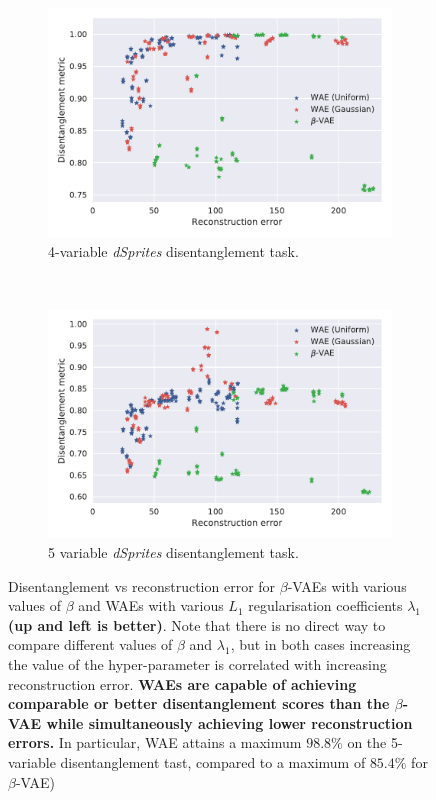 \documentclass{article}
\begin{document}
\begin{figure}[t!]
	\centering
	\begin{subfigure}[t]{0.5\textwidth}
		\centering
		\includegraphics[width=\columnwidth]{main_paper_reconstruction_error_vs_disentanglement_4}
		\caption{\label{subfig:disentanglement-vs-reconstruction-4}4-variable \emph{dSprites} disentanglement task.}
	\end{subfigure}%
	~ 
	\begin{subfigure}[t]{0.5\textwidth}
		\centering
		\includegraphics[width=\columnwidth]{main_paper_reconstruction_error_vs_disentanglement_5}
		\caption{\label{subfig:disentanglement-vs-reconstruction-5}5 variable \emph{dSprites} disentanglement task.}
	\end{subfigure}
	\caption{\label{fig:disentanglement-vs-reconstruction}Disentanglement vs reconstruction error for $\beta$-VAEs with various values of $\beta$ and WAEs with various $L_1$ regularisation coefficients $\lambda_1$ \textbf{(up and left is better)}. Note that there is no direct way to compare different values of $\beta$ and $\lambda_1$, but in both cases increasing the value of the hyper-parameter is correlated with increasing reconstruction error. \textbf{WAEs are capable of achieving comparable or better disentanglement scores than the $\beta$-VAE while simultaneously achieving lower reconstruction errors.} In particular, WAE attains a maximum $\mathbf{98.8\%}$ on the 5-variable disentanglement tast, compared to a maximum of $\mathbf{85.4\%}$ for $\beta$-VAE)}
\end{figure}
\end{document}
